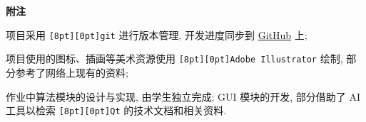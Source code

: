 \documentclass{ctexart}
\newcommand{\subtitletext}[1]{{\fontsize{16}{16} \textbf{#1} \vspace*{1ex}}}
\newcommand{\codebox}[1]{\colorbox[rgb]{0.9, 0.9, 0.9}{\texttt{\raisebox{0pt}[8pt][0pt]{#1}}}}
\begin{document}
\subtitletext{附注}

项目采用 \codebox{git} 进行版本管理, 开发进度同步到 \href{https://github.com/lastrivia/Coursework_Calc24}{GitHub} 上;

项目使用的图标、插画等美术资源使用 \codebox{Adobe Illustrator} 绘制, 部分参考了网络上现有的资料;

作业中算法模块的设计与实现, 由学生独立完成; GUI 模块的开发, 部分借助了 AI 工具以检索 \codebox{Qt} 的技术文档和相关资料.
\end{document}
